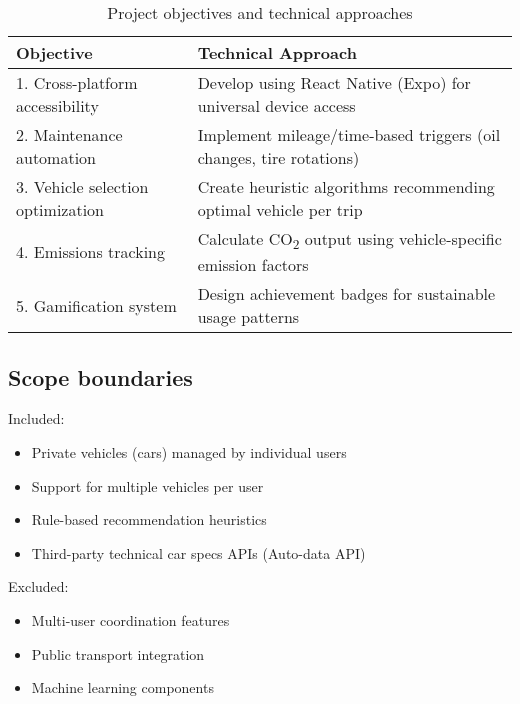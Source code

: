 \begin{table}[h]
    \centering
    \begin{tabular}{@{}p{} p{}@{}}
        \toprule
        \textbf{Objective} & \textbf{Technical Approach} \\ \midrule
        1. Cross-platform accessibility & Develop using React Native (Expo) for universal device access \\
        2. Maintenance automation & Implement mileage/time-based triggers (oil changes, tire rotations) \\
        3. Vehicle selection optimization & Create heuristic algorithms recommending optimal vehicle per trip \\
        4. Emissions tracking & Calculate CO\textsubscript{2} output using vehicle-specific emission factors \\
        5. Gamification system & Design achievement badges for sustainable usage patterns \\ \bottomrule
    \end{tabular}
    \caption{Project objectives and technical approaches}
\end{table}

\subsection{Scope boundaries}

Included:

\begin{itemize}
    \item Private vehicles (cars) managed by individual users
    
    \item Support for multiple vehicles per user
    
    \item Rule-based recommendation heuristics
    
    \item Third-party technical car specs APIs (Auto-data API)
\end{itemize}

Excluded:

\begin{itemize}
    \item Multi-user coordination features
    
    \item Public transport integration
    
    \item Machine learning components
\end{itemize}

